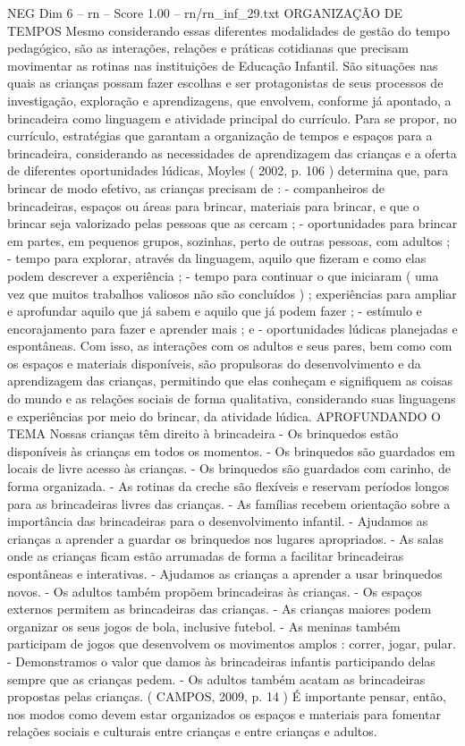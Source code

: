 \begin{textsample}{NEG Dim 6 – rn – Score 1.00 – rn/rn\_inf\_29.txt}  \label{ex:f6_neg_057}
ORGANIZAÇÃO DE TEMPOS Mesmo considerando essas diferentes modalidades de gestão do tempo pedagógico, são as interações, relações e práticas cotidianas que precisam movimentar as rotinas nas instituições de Educação Infantil.
São situações nas quais as crianças possam fazer escolhas e ser protagonistas de seus processos de investigação, exploração e aprendizagens, que envolvem, conforme já apontado, a brincadeira como linguagem e atividade principal do currículo.
Para se propor, no currículo, estratégias que garantam a organização de tempos e espaços para a brincadeira, considerando as necessidades de aprendizagem das crianças e a oferta de diferentes oportunidades lúdicas, Moyles ( 2002, p. 106 ) determina que, para brincar de modo efetivo, as crianças precisam de : - companheiros de brincadeiras, espaços ou áreas para brincar, materiais para brincar, e que o brincar seja valorizado pelas pessoas que as cercam ; - oportunidades para brincar em partes, em pequenos grupos, sozinhas, perto de outras pessoas, com adultos ; - tempo para explorar, através da linguagem, aquilo que fizeram e como elas podem descrever a experiência ; - tempo para continuar o que iniciaram ( uma vez que muitos trabalhos valiosos não são concluídos ) ; experiências para ampliar e aprofundar aquilo que já sabem e aquilo que já podem fazer ; - estímulo e encorajamento para fazer e aprender mais ; e - oportunidades lúdicas planejadas e espontâneas.
Com isso, as interações com os adultos e seus pares, bem como com os espaços e materiais disponíveis, são propulsoras do desenvolvimento e da aprendizagem das crianças, permitindo que elas conheçam e signifiquem as coisas do mundo e as relações sociais de forma qualitativa, considerando suas linguagens e experiências por meio do brincar, da atividade lúdica.
APROFUNDANDO O TEMA Nossas crianças têm direito à brincadeira - Os brinquedos estão disponíveis às crianças em todos os momentos. - Os brinquedos são guardados em locais de livre acesso às crianças. - Os brinquedos são guardados com carinho, de forma organizada. - As rotinas da creche são flexíveis e reservam períodos longos para as brincadeiras livres das crianças. - As famílias recebem orientação sobre a importância das brincadeiras para o desenvolvimento infantil. - Ajudamos as crianças a aprender a guardar os brinquedos nos lugares apropriados. - As salas onde as crianças ficam estão arrumadas de forma a facilitar brincadeiras espontâneas e interativas. - Ajudamos as crianças a aprender a usar brinquedos novos. - Os adultos também propõem brincadeiras às crianças. - Os espaços externos permitem as brincadeiras das crianças. - As crianças maiores podem organizar os seus jogos de bola, inclusive futebol. - As meninas também participam de jogos que desenvolvem os movimentos amplos : correr, jogar, pular. - Demonstramos o valor que damos às brincadeiras infantis participando delas sempre que as crianças pedem. - Os adultos também acatam as brincadeiras propostas pelas crianças. ( CAMPOS, 2009, p. 14 ) É importante pensar, então, nos modos como devem estar organizados os espaços e materiais para fomentar relações sociais e culturais entre crianças e entre crianças e adultos.

\end{textsample}
